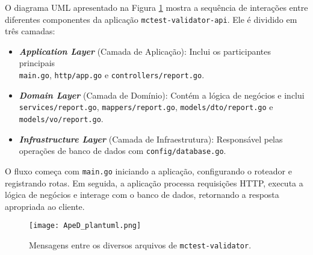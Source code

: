 O diagrama UML apresentado na Figura \ref{fig:plantuml} mostra a sequência de interações entre diferentes componentes da aplicação \texttt{mctest-validator-api}. Ele é dividido em três camadas:

\begin{itemize}
    \item \textbf{\textit{Application Layer}} (Camada de Aplicação): Inclui os participantes principais\\ \texttt{main.go}, \texttt{http/app.go} e \texttt{controllers/report.go}.
    \item \textbf{\textit{Domain Layer}} (Camada de Domínio): Contém a lógica de negócios e inclui\\
    \texttt{services/report.go}, \texttt{mappers/report.go}, \texttt{models/dto/report.go} e \texttt{models/vo/report.go}.
    \item \textbf{\textit{Infrastructure Layer}} (Camada de Infraestrutura): Responsável pelas operações de banco de dados com \texttt{config/database.go}.
\end{itemize}

O fluxo começa com \texttt{main.go} iniciando a aplicação, configurando o roteador e registrando rotas. Em seguida, a aplicação processa requisições HTTP, executa a lógica de negócios e interage com o banco de dados, retornando a resposta apropriada ao cliente.


\begin{figure}[h!]%
    \centering%
    \texttt{[image: ApeD\_plantuml.png]}
    \caption{Mensagens entre os diversos arquivos de \texttt{mctest-validator}.}
    \label{fig:plantuml}
\end{figure}%





